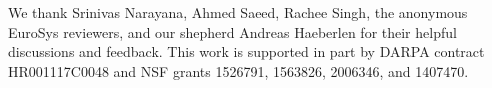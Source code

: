 \begin{acks}
We thank Srinivas Narayana, Ahmed Saeed, Rachee Singh, the anonymous EuroSys reviewers, and our shepherd Andreas Haeberlen for their helpful discussions and feedback.
This work is supported in part by DARPA contract HR001117C0048 and NSF grants 1526791, 1563826, 2006346, and 1407470.
\end{acks}
